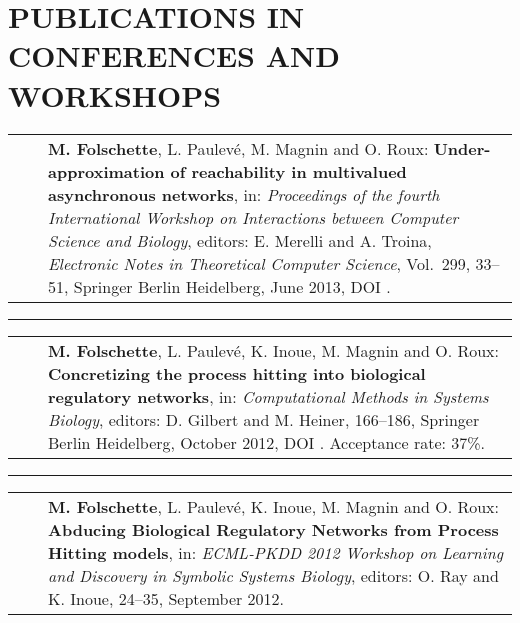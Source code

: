 \documentclass[11pt,a4paper,sans]{moderncv} %
\makeatletter
\renewcommand{\emph}{\textbf}
\newcommand{\myrule}{\vspace*{-2pt}\textcolor{color3}{\rule{\textwidth}{.5pt}}\vspace*{1pt}}
\newlength{\listitemsymbolwidthsep}
\newenvironment{publist}%
{\begin{tabular}{r@{}p{.935\textwidth}}\hspace{-\listitemsymbolwidthsep}\hspace{.45\hintscolumnwidth}}%
{\end{tabular}}
\newcommand{\newpub}[1]{\vspace{1pt}\begin{publist}\listitemsymbol~~&#1\end{publist}\vspace{1pt}}
\newenvironment{cvsection}[1]{%
  \vspace{1cm}
  \begin{minipage}{\textwidth}
  \section{#1}%
}{%
  \end{minipage}
}
\newcommand{\vol}{Vol.\ }
\newcommand{\no}{No.\ }
\makeatother
\begin{document}
\begin{cvsection}{PUBLICATIONS IN CONFERENCES AND WORKSHOPS}

\newpub{\emph{M. Folschette}, L. Paulevé, M. Magnin and O. Roux: %
  \emph{Under-approximation of reachability in multivalued asynchronous networks}, %
  in: \textit{Proceedings of the fourth International Workshop on Interactions between Computer Science and Biology}, editors: E. Merelli and A. Troina, %
  \textit{Electronic Notes in Theoretical Computer Science}, \vol 299,
  33--51, Springer Berlin Heidelberg, June 2013, DOI \httplink[10.1016/j.entcs.2013.11.004]{http://dx.doi.org/10.1016/j.entcs.2013.11.004}.}

\myrule

\newpub{\emph{M. Folschette}, L. Paulevé, K. Inoue, M. Magnin and O. Roux: %
  \emph{Concretizing the process hitting into biological regulatory networks}, %
  in: \textit{Computational Methods in Systems Biology}, editors: D. Gilbert and M. Heiner, %
  166--186, Springer Berlin Heidelberg, October 2012, DOI \httplink[10.1007/978-3-642-33636-2\_11]{dx.doi.org/10.1007/978-3-642-33636-2_11}.
  Acceptance rate: 37\%.}

\myrule

\newpub{\emph{M. Folschette}, L. Paulevé, K. Inoue, M. Magnin and O. Roux:
  \emph{Abducing Biological Regulatory Networks from Process Hitting models},
  in: \textit{ECML-PKDD 2012 Workshop on Learning and Discovery in Symbolic Systems Biology}, editors: O. Ray and K. Inoue, %
  24--35, September 2012.}

%

\end{cvsection}
\end{document}
